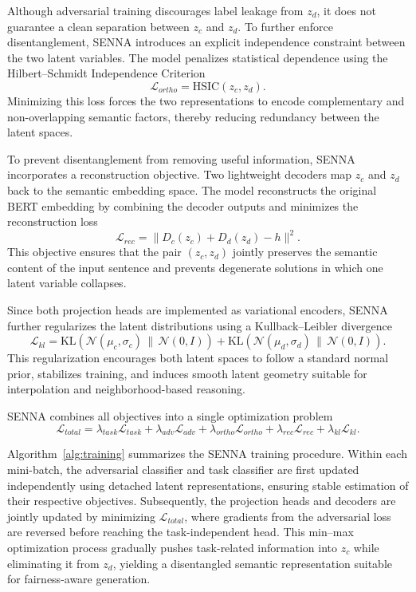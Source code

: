 \documentclass[runningheads]{llncs}
\begin{document}
Although adversarial training discourages label leakage from $z_d$, it does not guarantee a clean
separation between $z_c$ and $z_d$.
To further enforce disentanglement, SENNA introduces an explicit independence constraint between
the two latent variables.
The model penalizes statistical dependence using the Hilbert–Schmidt Independence Criterion
\begin{equation}
\mathcal{L}_{ortho} = \mathrm{HSIC}(z_c, z_d).
\end{equation}
Minimizing this loss forces the two representations to encode complementary and non-overlapping
semantic factors, thereby reducing redundancy between the latent spaces.

To prevent disentanglement from removing useful information, SENNA incorporates a reconstruction
objective.
Two lightweight decoders map $z_c$ and $z_d$ back to the semantic embedding space.
The model reconstructs the original BERT embedding by combining the decoder outputs and minimizes
the reconstruction loss
\begin{equation}
\mathcal{L}_{rec} = \lVert D_c(z_c) + D_d(z_d) - h \rVert^2.
\end{equation}
This objective ensures that the pair $(z_c, z_d)$ jointly preserves the semantic content of the
input sentence and prevents degenerate solutions in which one latent variable collapses.

Since both projection heads are implemented as variational encoders, SENNA further regularizes
the latent distributions using a Kullback–Leibler divergence
\begin{equation}
\mathcal{L}_{kl} =
\mathrm{KL}(\mathcal{N}(\mu_c,\sigma_c)\,\|\,\mathcal{N}(0,I)) +
\mathrm{KL}(\mathcal{N}(\mu_d,\sigma_d)\,\|\,\mathcal{N}(0,I)).
\end{equation}
This regularization encourages both latent spaces to follow a standard normal prior, stabilizes
training, and induces smooth latent geometry suitable for interpolation and neighborhood-based
reasoning.

SENNA combines all objectives into a single optimization problem
\begin{equation}
\mathcal{L}_{total} =
\lambda_{task}\mathcal{L}_{task}
+ \lambda_{adv}\mathcal{L}_{adv}
+ \lambda_{ortho}\mathcal{L}_{ortho}
+ \lambda_{rec}\mathcal{L}_{rec}
+ \lambda_{kl}\mathcal{L}_{kl}.
\end{equation}

Algorithm~\ref{alg:training} summarizes the SENNA training procedure. Within each mini-batch, the adversarial classifier and task classifier are first updated independently using detached latent representations, ensuring stable estimation of their respective objectives. Subsequently, the projection heads and decoders are jointly updated by minimizing $\mathcal{L}_{total}$, where gradients from the adversarial loss are reversed before reaching the task-independent head. This min–max optimization process gradually pushes task-related information into $z_c$ while eliminating it from $z_d$, yielding a disentangled semantic representation suitable for fairness-aware generation.
\end{document}
